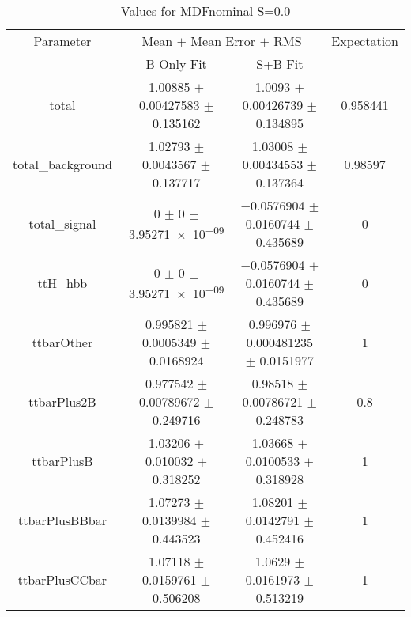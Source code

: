 \begin{table}
\centering
\caption{Values for MDFnominal S=0.0}
\begin{tabular}{cccc}
\toprule
Parameter & \multicolumn{2}{c}{Mean $\pm$ Mean Error $\pm$ RMS} & Expectation\\
 & B-Only Fit & S+B Fit & \\
\midrule
total & \num{1.00885} $\pm$ \num{0.00427583} $\pm$ \num{0.135162} & \num{1.0093} $\pm$ \num{0.00426739} $\pm$ \num{0.134895} & \num{0.958441}\\
total\_background & \num{1.02793} $\pm$ \num{0.0043567} $\pm$ \num{0.137717} & \num{1.03008} $\pm$ \num{0.00434553} $\pm$ \num{0.137364} & \num{0.98597}\\
total\_signal & \num{0} $\pm$ \num{0} $\pm$ \num{3.95271e-09} & \num{-0.0576904} $\pm$ \num{0.0160744} $\pm$ \num{0.435689} & \num{0}\\
ttH\_hbb & \num{0} $\pm$ \num{0} $\pm$ \num{3.95271e-09} & \num{-0.0576904} $\pm$ \num{0.0160744} $\pm$ \num{0.435689} & \num{0}\\
ttbarOther & \num{0.995821} $\pm$ \num{0.0005349} $\pm$ \num{0.0168924} & \num{0.996976} $\pm$ \num{0.000481235} $\pm$ \num{0.0151977} & \num{1}\\
ttbarPlus2B & \num{0.977542} $\pm$ \num{0.00789672} $\pm$ \num{0.249716} & \num{0.98518} $\pm$ \num{0.00786721} $\pm$ \num{0.248783} & \num{0.8}\\
ttbarPlusB & \num{1.03206} $\pm$ \num{0.010032} $\pm$ \num{0.318252} & \num{1.03668} $\pm$ \num{0.0100533} $\pm$ \num{0.318928} & \num{1}\\
ttbarPlusBBbar & \num{1.07273} $\pm$ \num{0.0139984} $\pm$ \num{0.443523} & \num{1.08201} $\pm$ \num{0.0142791} $\pm$ \num{0.452416} & \num{1}\\
ttbarPlusCCbar & \num{1.07118} $\pm$ \num{0.0159761} $\pm$ \num{0.506208} & \num{1.0629} $\pm$ \num{0.0161973} $\pm$ \num{0.513219} & \num{1}\\
\bottomrule
\end{tabular}
\end{table}